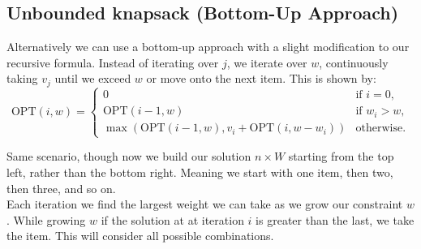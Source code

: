         
        
    


\subsection*{Unbounded knapsack (Bottom-Up Approach)}
\noindent
Alternatively we can use a bottom-up approach with a slight modification to our recursive formula. Instead of iterating over $j$, we iterate over $w$, 
continuously taking $v_j$ until we exceed $w$ or move onto the next item. This is shown by:
\[
\text{OPT}(i, w) = 
\begin{cases} 
    0 & \text{if } i = 0, \\
    \text{OPT}(i-1, w) & \text{if } w_i > w, \\
    \max\left(\text{OPT}(i-1, w), v_i + \text{OPT}(i, w - w_i)\right) & \text{otherwise.}
\end{cases}
\]

\noindent
Same scenario, though now we build our solution $n\times W$ starting from the top left, rather than the bottom right. 
Meaning we start with one item, then two, then three, and so on.\\

\noindent
Each iteration we find the largest weight we can take as we grow our constraint $w$. While growing $w$ if the solution at 
at iteration $i$ is greater than the last, we take the item. This will consider all possible combinations.\\

